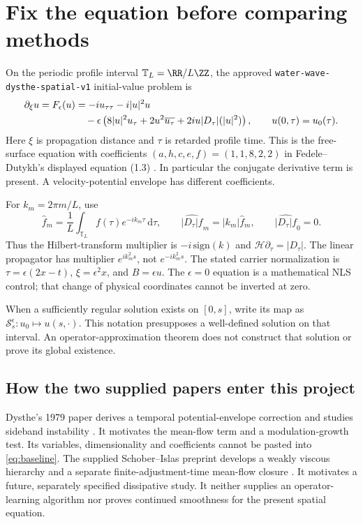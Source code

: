 \documentclass[11pt]{article}
\newcommand{\D}{\lvert D_\tau\rvert}
\newcommand{\TT}{\mathbb T_L}
\newcommand{\dd}{\,\mathrm d}
\begin{document}
\section{Fix the equation before comparing methods}
\label{sec:model}
On the periodic profile interval $\TT=\RR/L\ZZ$, the approved
\texttt{water-wave-dysthe-spatial-v1} initial-value problem is
\begin{align}
\partial_\xi u=F_\epsilon(u)
&=-i u_{\tau\tau}-i|u|^2u \notag\\
&\quad-\epsilon\left(8|u|^2u_\tau
+2u^2\overline{u_\tau}+2iu\D(|u|^2)\right),
\qquad u(0,\tau)=u_0(\tau).
\label{eq:baseline}
\end{align}
Here $\xi$ is propagation distance and $\tau$ is retarded profile time.
This is the free-surface equation with coefficients
$(a,h,c,e,f)=(1,1,8,2,2)$ in Fedele--Dutykh's displayed equation (1.3)
\cite{fedele}. In particular the conjugate derivative term is present.
A velocity-potential envelope has different coefficients.

For $k_m=2\pi m/L$, use
\[
\widehat f_m=\frac1L\int_{\TT}f(\tau)e^{-ik_m\tau}\dd\tau,\qquad
\widehat{\D f}_m=|k_m|\widehat f_m,\qquad \widehat{\D f}_0=0.
\]
Thus the Hilbert-transform multiplier is $-i\,\mathrm{sign}(k)$ and
$\mathcal H\partial_\tau=\D$. The linear propagator has multiplier
$e^{ik_m^2s}$, not $e^{-ik_m^2s}$.
The stated carrier normalization is
$\tau=\epsilon(2x-t)$, $\xi=\epsilon^2x$, and $B=\epsilon u$.
The $\epsilon=0$ equation is a mathematical NLS control; that change of
physical coordinates cannot be inverted at zero.

When a sufficiently regular solution exists on $[0,s]$, write its map as
$\mathcal S_s^\epsilon:u_0\mapsto u(s,\cdot)$. This notation presupposes a
well-defined solution on that interval. An operator-approximation theorem
does not construct that solution or prove its global existence.

\subsection{How the two supplied papers enter this project}
Dysthe's 1979 paper derives a temporal potential-envelope correction and
studies sideband instability \cite{dysthe1979}. It motivates the mean-flow
term and a modulation-growth test. Its variables, dimensionality and
coefficients cannot be pasted into \eqref{eq:baseline}.
The supplied Schober--Islas preprint develops a weakly viscous hierarchy
and a separate finite-adjustment-time mean-flow closure
\cite{schober}. It motivates a future, separately specified dissipative
study. It neither supplies an operator-learning algorithm nor proves
continued smoothness for the present spatial equation.
\end{document}
